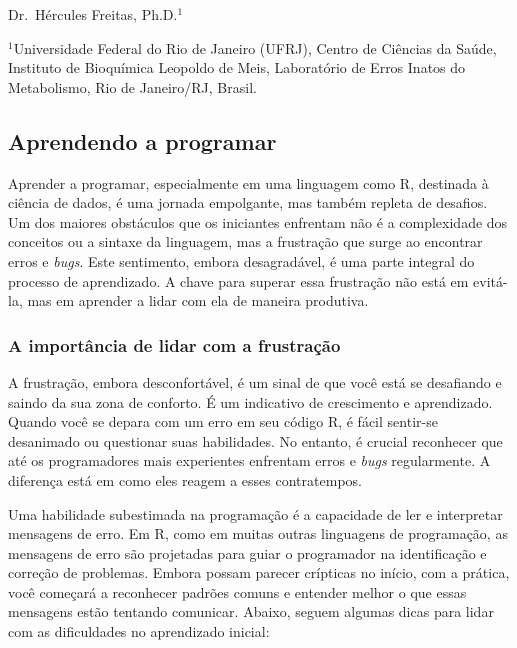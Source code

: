 \documentclass[
]{book}
\begin{document}
Dr.~Hércules Freitas, Ph.D.\(^1\)

\(^1\)Universidade Federal do Rio de Janeiro (UFRJ), Centro de Ciências da Saúde, Instituto de Bioquímica Leopoldo de Meis, Laboratório de Erros Inatos do Metabolismo, Rio de Janeiro/RJ, Brasil.

\subsection{Aprendendo a programar}\label{aprendendo-a-programar}

Aprender a programar, especialmente em uma linguagem como R, destinada à ciência de dados, é uma jornada empolgante, mas também repleta de desafios. Um dos maiores obstáculos que os iniciantes enfrentam não é a complexidade dos conceitos ou a sintaxe da linguagem, mas a frustração que surge ao encontrar erros e \emph{bugs}. Este sentimento, embora desagradável, é uma parte integral do processo de aprendizado. A chave para superar essa frustração não está em evitá-la, mas em aprender a lidar com ela de maneira produtiva.

\subsubsection{A importância de lidar com a frustração}\label{a-importuxe2ncia-de-lidar-com-a-frustrauxe7uxe3o}

A frustração, embora desconfortável, é um sinal de que você está se desafiando e saindo da sua zona de conforto. É um indicativo de crescimento e aprendizado. Quando você se depara com um erro em seu código R, é fácil sentir-se desanimado ou questionar suas habilidades. No entanto, é crucial reconhecer que até os programadores mais experientes enfrentam erros e \emph{bugs} regularmente. A diferença está em como eles reagem a esses contratempos.

Uma habilidade subestimada na programação é a capacidade de ler e interpretar mensagens de erro. Em R, como em muitas outras linguagens de programação, as mensagens de erro são projetadas para guiar o programador na identificação e correção de problemas. Embora possam parecer crípticas no início, com a prática, você começará a reconhecer padrões comuns e entender melhor o que essas mensagens estão tentando comunicar. Abaixo, seguem algumas dicas para lidar com as dificuldades no aprendizado inicial:
\end{document}
